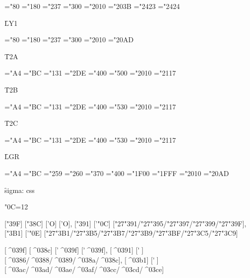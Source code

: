 \ToneZZZSerifRegular
\ChrA="80 \ChrB="180
\PrintCode
\ChrA="237 \ChrB="300
\PrintCode
\ChrA="2010 \ChrB="203B
\PrintCode
\ChrA="2423 \ChrB="2424
\PrintCode

{\f LY1}

\LYoneZZZSerifRegular
\ChrA="80 \ChrB="180
\PrintCode
\ChrA="237 \ChrB="300
\PrintCode
\ChrA="2010 \ChrB="20AD
\PrintCode

{\f T2A}

\TtwoaZZZSerifRegular
\ChrA="A4 \ChrB="BC
\PrintCode
\ChrA="131 \ChrB="2DE
\PrintCode
\ChrA="400 \ChrB="500
\PrintCode
\ChrA="2010 \ChrB="2117
\PrintCode

{\f T2B}

\TtwobZZZSerifRegular
\ChrA="A4 \ChrB="BC
\PrintCode
\ChrA="131 \ChrB="2DE
\PrintCode
\ChrA="400 \ChrB="530
\PrintCode
\ChrA="2010 \ChrB="2117
\PrintCode

{\f T2C}

\TtwocZZZSerifRegular
\ChrA="A4 \ChrB="BC
\PrintCode
\ChrA="131 \ChrB="2DE
\PrintCode
\ChrA="400 \ChrB="530
\PrintCode
\ChrA="2010 \ChrB="2117
\PrintCode

{\f LGR}

\LgrZZZSerifRegular
\ChrA="A4 \ChrB="BC
\PrintCode
\ChrA="259 \ChrB="260
\PrintCode
\ChrA="370 \ChrB="400
\PrintCode
\ChrA="1F00 \ChrB="1FFF
\PrintCode
\ChrA="2010 \ChrB="20AD
\PrintCode

{\f sigma:} ^^63^^73^^73

\catcode"0C=12

[\char"39F] [\char"38C] ['\relax Ο] ['Ο],
[\char"391] ['\char"0C] [\char"27\char"391/\char"27\char"395/\char"27\char"397/\char"27\char"399/\char"27\char"39F],
[\char"3B1] ['\char"0E] [\char"27\char"3B1/\char"27\char"3B5/\char"27\char"3B7/\char"27\char"3B9/\char"27\char"3BF/\char"27\char"3C5/\char"27\char"3C9]

[^^^^039f] [^^^^038c] ['\relax ^^^^039f] [^^27^^^^039f],
[^^^^0391] [^^27^^0c] [^^^^0386/^^^^0388/^^^^0389/^^^^038a/^^^^038c],
[^^^^03b1] [^^27^^0e] [^^^^03ac/^^^^03ad/^^^^03ae/^^^^03af/^^^^03cc/^^^^03cd/^^^^03ce]

\bye
